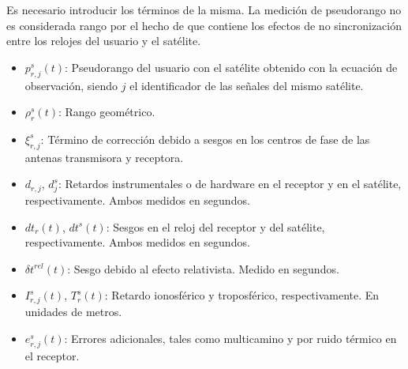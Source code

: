 \documentclass[a4paper,12pt,oneside,onecolumn,final,openright]{book}%
\begin{document}
	Es necesario introducir los términos de la misma. La medición de pseudorango no es considerada rango por el hecho de que contiene los efectos de no sincronización entre los relojes del usuario y el satélite. 
\begin{itemize}
	\item $p_{r,j}^s(t)$: Pseudorango del usuario con el satélite obtenido con la ecuación de observación, siendo $j$ el identificador de las señales del mismo satélite.
	\item $\rho_r^s(t)$: Rango geométrico.
	\item $\xi_{r,j}^s$: Término de corrección debido a sesgos en los centros de fase de las antenas transmisora y receptora.
	\item $d_{r,j}$, $d_j^s$: Retardos instrumentales o de hardware en el receptor y en el satélite, respectivamente. Ambos medidos en segundos.
	\item $dt_r(t)$, $dt^s(t)$: Sesgos en el reloj del receptor y del satélite, respectivamente. Ambos medidos en segundos. 
	\item $\delta t^{rel}(t)$: Sesgo debido al efecto relativista. Medido en segundos. 
	\item $I_{r,j}^s(t)$, $T_r^s(t)$: Retardo ionosférico y troposférico, respectivamente. En unidades de metros.
	\item $e_{r,j}^s(t)$: Errores adicionales, tales como multicamino y por ruido térmico en el receptor.
\end{itemize}
\end{document}
